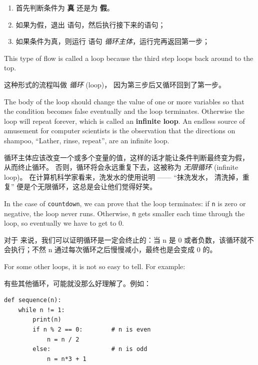 \begin{enumerate}

\item 首先判断条件为 {\bf 真} 还是为 {\bf 假}。

\item 如果为假，退出  语句，然后执行接下来的语句；

\item 如果条件为真，则运行  语句 {\em 循环主体}，运行完再返回第一步；

\end{enumerate}

This type of flow is called a loop because the third step
loops back around to the top.
    

这种形式的流程叫做 {\em 循环} (loop)， 因为第三步后又循环回到了第一步。
    

The body of the loop should change the value of one or more variables
so that the condition becomes false eventually and the loop
terminates.  Otherwise the loop will repeat forever, which is called
an {\bf infinite loop}.  An endless source of amusement for computer
scientists is the observation that the directions on shampoo,
``Lather, rinse, repeat'', are an infinite loop.
  

循环主体应该改变一个或多个变量的值，这样的话才能让条件判断最终变为假，
从而终止循环。 否则，循环将会永远重复下去，这被称为 {\em 无限循环} (infinite loop)。 在计算机科学家看来，洗发水的使用说明 —— ``抹洗发水，
清洗掉，重复'' 便是个无限循环，这总是会让他们觉得好笑。
  

In the case of {\tt countdown}, we can prove that the loop
terminates: if {\tt n} is zero or negative, the loop never runs.
Otherwise, {\tt n} gets smaller each time through the
loop, so eventually we have to get to 0.

对于  来说，我们可以证明循环是一定会终止的：当 n 是 0 或者负数，该循环就不会执行；不然 n 通过每次循环之后慢慢减小，最终也是会变成 0 的。

For some other loops, it is not so easy to tell.  For example:

有些其他循环，可能就没那么好理解了。例如：

\begin{lstlisting}
def sequence(n):
    while n != 1:
        print(n)
        if n % 2 == 0:        # n is even
            n = n / 2
        else:                 # n is odd
            n = n*3 + 1
\end{lstlisting}

